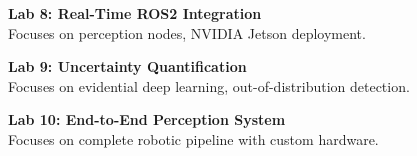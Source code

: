 \vspace{0.2cm}

\noindent\textbf{Lab 8: Real-Time ROS2 Integration} \\
Focuses on perception nodes, NVIDIA Jetson deployment.

\vspace{0.2cm}

\noindent\textbf{Lab 9: Uncertainty Quantification} \\
Focuses on evidential deep learning, out-of-distribution detection.

\vspace{0.2cm}

\noindent\textbf{Lab 10: End-to-End Perception System} \\
Focuses on complete robotic pipeline with custom hardware.

\vspace{0.2cm}

\newpage
{}
